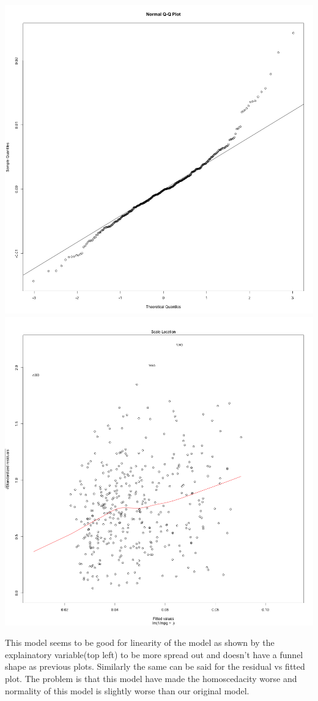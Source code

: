 \documentclass[11pt]{article} %
\begin{document}
\begin{center}
\includegraphics[scale=0.13]{4_QQplot}
\includegraphics[scale=0.13]{4_Variance}
\end{center}
This model seems to be good for linearity of the model as shown by the explainatory variable(top left) to be more spread out and doesn't have a funnel shape as previous plots. Similarly the same can be said for the residual vs fitted plot. The problem is that this model have made the homoscedacity worse and normality of this model is slightly worse than our original model.
\end{document}
